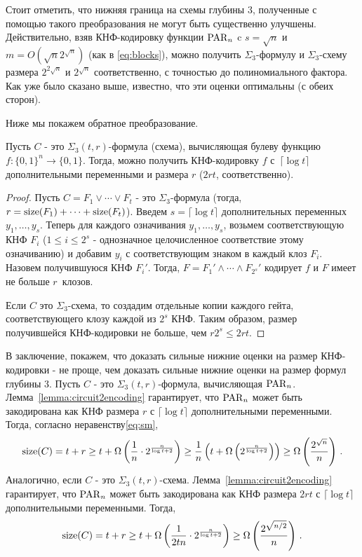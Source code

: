 Стоит отметить, что нижняя граница на схемы глубины $3$, полученные с помощью такого преобразования не могут быть существенно улучшены.
Действительно, взяв КНФ-кодировку функции $\operatorname{PAR}_n$ c $s = \sqrt{n}$ и $m = O(\sqrt{n}2^{\sqrt{n}})$ (как в \eqref{eq:blocks}), 
можно получить $\Sigma_3$-формулу и $\Sigma_3$-схему размера $2^{2\sqrt{n}}$ и $2^{\sqrt{n}}$ соответственно, с точностью до полиномиального фактора. 
Как уже было сказано выше, известно, что эти оценки оптимальны (с обеих сторон).

Ниже мы покажем обратное преобразование.

\begin{lemma}\label{lemma:circuit2encoding}
	Пусть $C$ - это $\Sigma_3(t,r)$-формула (схема), вычисляющая булеву функцию $f \colon \{0,1\}^n \to \{0,1\}$. Тогда,
	можно получить КНФ-кодировку $f$ с~$\lceil \log t \rceil$ дополнительными переменными и размера $r$ ($2rt$, соответственно).
\end{lemma}
\begin{proof}
	Пусть $C=F_1 \lor \dotsb \lor F_{t}$ - это $\Sigma_3$-формула (тогда, $r=\operatorname{size}(F_1)+\dotsb+\operatorname{size}(F_{t})$). Введем $s=\lceil\log t\rceil$ дополнительных переменных $y_1, \dotsc, y_s$. Теперь для каждого означивания $y_1, \dotsc, y_s$, возьмем соответствующую КНФ $F_i$ ($1 \le i \le 2^s$ - однозначное целочисленное соответствие 
	этому означиванию) и добавим
	$y_i$ с соответствующим знаком в каждый клоз $F_i$.
	Назовем получившуюся КНФ $F_i'$. Тогда, $F=F_1'\land \dotsb \land F_{2^s}'$ кодирует $f$ и $F$ имеет не больше $r$~клозов.
	
	Если $C$ это $\Sigma_3$-схема, то создадим отдельные копии каждого гейта, соответствующего клозу каждой из $2^s$ КНФ. 
	Таким образом, размер получившейся КНФ-кодировки не больше, чем  $r2^s \le 2rt$.
\end{proof}

В заключение, покажем, что доказать сильные нижние оценки на размер КНФ-кодировки -
не проще, чем доказать сильные нижние оценки на размер формул глубины $3$.
Пусть $C$ - это $\Sigma_3(t,r)$-формула, вычисляющая $\operatorname{PAR}_n$.
Лемма~\ref{lemma:circuit2encoding} гарантирует, что $\operatorname{PAR}_n$ может быть закодирована как КНФ размера $r$ с $\lceil \log t \rceil$ дополнительными переменными. 
Тогда, согласно неравенству\eqref{eq:sm},
\[\operatorname{size}(C) = t + r \ge t + \Omega \left( \frac{1}{n}\cdot 2^{\frac{n}{\log t + 2}} \right) \ge \frac 1n \left( t + \Omega\left( 2^{\frac{n}{\log t + 2}}\right)\right) \ge \Omega\left(\frac{2^{\sqrt{n}}}{n}\right) \, .\]
Аналогично, если $C$ - это $\Sigma_3(t,r)$-схема. Лемма~\ref{lemma:circuit2encoding} гарантирует, что $\operatorname{PAR}_n$ может быть закодирована как КНФ размера $2rt$ с $\lceil \log t \rceil$ дополнительными переменными.
Тогда,
\[\operatorname{size}(C) = t + r \ge t + \Omega \left( \frac{1}{2tn}\cdot 2^{\frac{n}{\log t + 2}} \right) \ge \Omega\left(\frac{2^{\sqrt{n/2}}}{n}\right) \, .\]